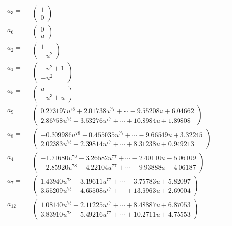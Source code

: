 \documentclass[1p]{elsarticle_modified}
\theoremstyle{definition}
\begin{document}
\begin{tabular}{m{7pt} m{180pt} m{7pt} m{180pt} }
\flushright $a_{3}=$&$\begin{pmatrix}1\\0\end{pmatrix}$ \\
\flushright $a_{6}=$&$\begin{pmatrix}0\\u\end{pmatrix}$ \\
\flushright $a_{2}=$&$\begin{pmatrix}1\\- u^2\end{pmatrix}$ \\
\flushright $a_{1}=$&$\begin{pmatrix}- u^2+1\\- u^2\end{pmatrix}$ \\
\flushright $a_{5}=$&$\begin{pmatrix}u\\- u^3+u\end{pmatrix}$ \\
\flushright $a_{9}=$&$\begin{pmatrix}0.273197 u^{78}+2.01738 u^{77}+\cdots-9.55208 u+6.04662\\2.86758 u^{78}+3.53276 u^{77}+\cdots+10.8984 u+1.89808\end{pmatrix}$ \\
\flushright $a_{8}=$&$\begin{pmatrix}-0.309986 u^{78}+0.455035 u^{77}+\cdots-9.66549 u+3.32245\\2.02383 u^{78}+2.39814 u^{77}+\cdots+8.31238 u+0.949213\end{pmatrix}$ \\
\flushright $a_{4}=$&$\begin{pmatrix}-1.71680 u^{78}-3.26582 u^{77}+\cdots-2.40110 u-5.06109\\-2.85920 u^{78}-4.22104 u^{77}+\cdots-9.93888 u-4.06187\end{pmatrix}$ \\
\flushright $a_{7}=$&$\begin{pmatrix}1.43940 u^{78}+3.19611 u^{77}+\cdots-3.75783 u+5.82097\\3.55209 u^{78}+4.65508 u^{77}+\cdots+13.6963 u+2.69004\end{pmatrix}$ \\
\flushright $a_{12}=$&$\begin{pmatrix}1.08140 u^{78}+2.11225 u^{77}+\cdots+8.48887 u+6.87053\\3.83910 u^{78}+5.49216 u^{77}+\cdots+10.2711 u+4.75553\end{pmatrix}$ \\

\end{tabular}
\end{document}
